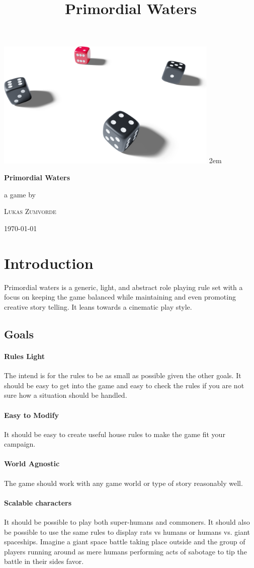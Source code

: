 \documentclass[11pt]{article}
\date{}
\title{Primordial Waters}
\renewcommand\maketitle{
\begin{titlepage}
\centering
\includegraphics[width=0.8\textwidth]{dice_cut.png}
\topskip250pt\vspace{5cm}
\fboxsep2em\colorbox{black!100}{
{\color{white}\bfseries\fontsize{24pt}{29pt}\selectfont \quad Primordial Waters\quad\par}
}
\vfill
a game by\par
\textsc{Lukas Zumvorde}

\vfill

{\large \today\par}
\end{titlepage}}
\begin{document}
\maketitle
\tableofcontents

{


\section{Introduction}
\label{sec:org0b918a0}

Primordial waters is a generic, light, and abstract role playing rule set with a focus on keeping the game balanced while maintaining and even promoting creative story telling. It leans towards a cinematic play style.

\subsection{Goals}
\label{sec:org20e5481}

\paragraph*{Rules Light}
\label{sec:org450303a}

The intend is for the rules to be as small as possible given the other goals. It should be easy to get into the game and easy to check the rules if you are not sure how a situation should be handled.

\paragraph*{Easy to Modify}
\label{sec:orgc8cd49d}

It should be easy to create useful house rules to make the game fit your campaign.

\paragraph*{World Agnostic}
\label{sec:orgaf0d97d}

The game should work with any game world or type of story reasonably well.

\paragraph*{Scalable characters}
\label{sec:org0c32246}

It should be possible to play both super-humans and commoners. It should also be possible to use the same rules to display rats vs humans or humans vs. giant spaceships. Imagine a giant space battle taking place outside and the group of players running around as mere humans performing acts of sabotage to tip the battle in their sides favor. 

}
\end{document}
